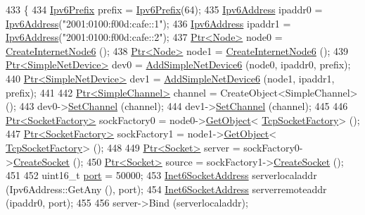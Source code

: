 \begin{DoxyCode}
433 \{
434   \hyperlink{classns3_1_1Ipv6Prefix}{Ipv6Prefix} prefix = \hyperlink{classns3_1_1Ipv6Prefix}{Ipv6Prefix}(64);
435   \hyperlink{classns3_1_1Ipv6Address}{Ipv6Address} ipaddr0 = \hyperlink{classns3_1_1Ipv6Address}{Ipv6Address}(\textcolor{stringliteral}{"2001:0100:f00d:cafe::1"});
436   \hyperlink{classns3_1_1Ipv6Address}{Ipv6Address} ipaddr1 = \hyperlink{classns3_1_1Ipv6Address}{Ipv6Address}(\textcolor{stringliteral}{"2001:0100:f00d:cafe::2"});
437   \hyperlink{classns3_1_1Ptr}{Ptr<Node>} node0 = \hyperlink{classTcpTestCase_a45d4f2a1d4a2f311c529469bdc9dfe00}{CreateInternetNode6} ();
438   \hyperlink{classns3_1_1Ptr}{Ptr<Node>} node1 = \hyperlink{classTcpTestCase_a45d4f2a1d4a2f311c529469bdc9dfe00}{CreateInternetNode6} ();
439   \hyperlink{classns3_1_1Ptr}{Ptr<SimpleNetDevice>} dev0 = \hyperlink{classTcpTestCase_a4385a5d6f0b5fcf2dbbe1cccb0810ea9}{AddSimpleNetDevice6} (node0, ipaddr0, 
      prefix);
440   \hyperlink{classns3_1_1Ptr}{Ptr<SimpleNetDevice>} dev1 = \hyperlink{classTcpTestCase_a4385a5d6f0b5fcf2dbbe1cccb0810ea9}{AddSimpleNetDevice6} (node1, ipaddr1, 
      prefix);
441 
442   \hyperlink{classns3_1_1Ptr}{Ptr<SimpleChannel>} channel = CreateObject<SimpleChannel> ();
443   dev0->\hyperlink{classns3_1_1SimpleNetDevice_af9e9828ad584b5ba538f18f645f162e0}{SetChannel} (channel);
444   dev1->\hyperlink{classns3_1_1SimpleNetDevice_af9e9828ad584b5ba538f18f645f162e0}{SetChannel} (channel);
445 
446   \hyperlink{classns3_1_1Ptr}{Ptr<SocketFactory>} sockFactory0 = node0->\hyperlink{classns3_1_1Object_a13e18c00017096c8381eb651d5bd0783}{GetObject}<
      \hyperlink{classns3_1_1TcpSocketFactory}{TcpSocketFactory}> ();
447   \hyperlink{classns3_1_1Ptr}{Ptr<SocketFactory>} sockFactory1 = node1->\hyperlink{classns3_1_1Object_a13e18c00017096c8381eb651d5bd0783}{GetObject}<
      \hyperlink{classns3_1_1TcpSocketFactory}{TcpSocketFactory}> ();
448 
449   \hyperlink{classns3_1_1Ptr}{Ptr<Socket>} server = sockFactory0->\hyperlink{classns3_1_1SocketFactory_a97351e6e7860503a4912042530449f62}{CreateSocket} ();
450   \hyperlink{classns3_1_1Ptr}{Ptr<Socket>} source = sockFactory1->\hyperlink{classns3_1_1Socket_ad448a62bb50ad3dbac59c879a885a8d2}{CreateSocket} ();
451 
452   uint16\_t \hyperlink{dsdv-manet_8cc_a8e0798404bf2cf5dabb84c5ba9a4f236}{port} = 50000;
453   \hyperlink{classns3_1_1Inet6SocketAddress}{Inet6SocketAddress} serverlocaladdr (Ipv6Address::GetAny (), port);
454   \hyperlink{classns3_1_1Inet6SocketAddress}{Inet6SocketAddress} serverremoteaddr (ipaddr0, port);
455 
456   server->Bind (serverlocaladdr);

\end{DoxyCode}
